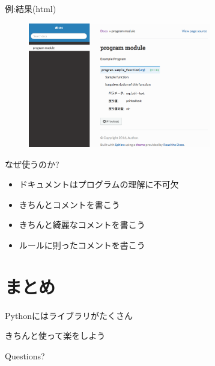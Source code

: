 \documentclass[12pt, xetex, xcolor=pdftex, dvipsnames]{beamer}
\begin{document}
\begin{frame}{例:結果(html)}
    \begin{figure}
        \centering
        \includegraphics[width=8cm]{img/sphinx_dst.png}
    \end{figure}
\end{frame}
\begin{frame}{なぜ使うのか?}
    \begin{itemize}
        \item ドキュメントはプログラムの理解に不可欠
        \item きちんとコメントを書こう
        \item きちんと綺麗なコメントを書こう
        \item ルールに則ったコメントを書こう
    \end{itemize}
\end{frame}
\section{まとめ}
\begin{frame}
    Pythonにはライブラリがたくさん

    きちんと使って楽をしよう
\end{frame}
\begin{frame}[standout]
  Questions?
\end{frame}
\end{document}
